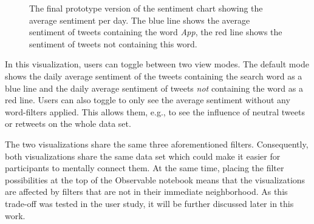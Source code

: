 \begin{figure}[htb!]
    \caption{The final prototype version of the sentiment chart showing the average sentiment per day. The blue line shows the average sentiment of tweets containing the word \emph{App}, the red line shows the sentiment of tweets not containing this word.}
    \label{fig:sentiment_linechart}
\end{figure}

In this visualization, users can toggle between two view modes. The default mode shows the daily average sentiment of the tweets containing the search word as a blue line and the daily average sentiment of tweets \emph{not} containing the word as a red line. Users can also toggle to only see the average sentiment without any word-filters applied. This allows them, e.g., to see the influence of neutral tweets or retweets on the whole data set.

The two visualizations share the same three aforementioned filters. Consequently, both visualizations share the same data set which could make it easier for participants to mentally connect them. At the same time, placing the filter possibilities at the top of the Observable notebook means that the visualizations are affected by filters that are not in their immediate neighborhood. As this trade-off was tested in the user study, it will be further discussed later in this work.

